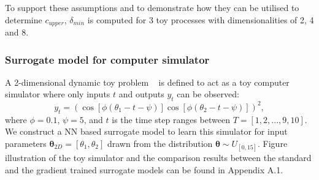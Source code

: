 \documentclass{article}
\begin{document}
To support these assumptions and to demonstrate how they can be utilised to determine $c_{upper}$, $\delta_{min}$ is computed for 3 toy processes with dimensionalities of 2, 4 and 8. 

\subsubsection{Surrogate model for computer simulator}
A 2-dimensional dynamic toy problem ~\cite{chen2019bayesian} is defined to act as a toy computer simulator where only inputs $t$ and outputs $y_t$ can be observed:
\begin{equation}
	\label{eq:2d_func}
	y_t = (\cos [ \phi(\theta_1 - t - \psi)] \cos [ \phi(\theta_2 - t - \psi)])^2,
\end{equation}
where $\phi = 0.1$, $\psi = 5$, and $t$ is the time step ranges between $T = [1, 2,..., 9, 10]$. We construct a NN based surrogate model to learn this simulator for input parameters $\boldsymbol{\theta}_{2D} = [\theta_1, \theta_2]$ drawn from the distribution $\mathbf{\theta} \sim U_{[0, 15]}$. Figure illustration of the toy simulator and the comparison results between the standard and the gradient trained surrogate models can be found in Appendix A.1.
\end{document}
